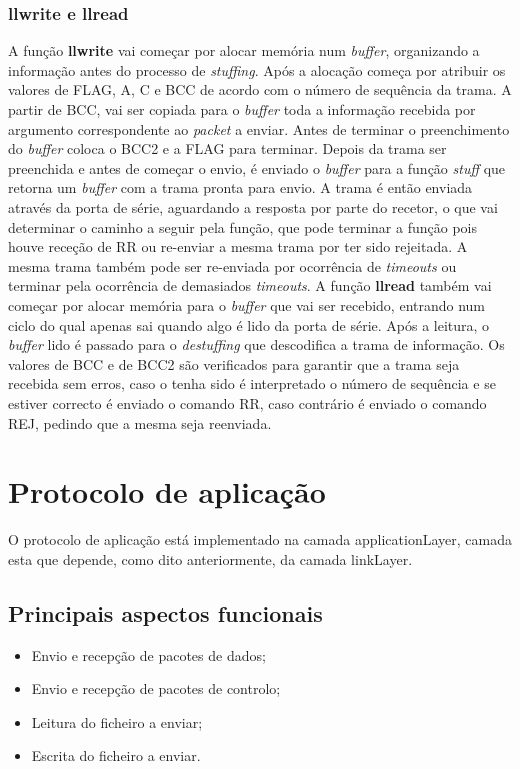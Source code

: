 \documentclass[11pt]{article}
\begin{document}
 \subsubsection{llwrite e llread}
    
    A função \textbf{llwrite} vai começar por alocar memória num \textit{buffer}, organizando a informação antes do processo de \textit{stuffing}. Após a alocação começa por atribuir os valores de FLAG, A, C e BCC de acordo com o número de sequência da trama. A partir de BCC, vai ser copiada para o \textit{buffer} toda a informação recebida por argumento correspondente ao \textit{packet} a enviar. Antes de terminar o preenchimento do \textit{buffer} coloca o BCC2 e a FLAG para terminar. Depois da trama ser preenchida e antes de começar o envio, é enviado o \textit{buffer} para a função \textit{stuff} que retorna um \textit{buffer} com a trama pronta para envio. A trama é então enviada através da porta de série, aguardando a resposta por parte do recetor, o que vai determinar o caminho a seguir pela função, que pode terminar a função pois houve receção de RR ou re-enviar a mesma trama por ter sido rejeitada. A mesma trama também pode ser re-enviada por ocorrência de \textit{timeouts} ou terminar pela ocorrência de demasiados \textit{timeouts}. A função \textbf{llread} também vai começar por alocar memória para o \textit{buffer} que vai ser recebido, entrando num ciclo do qual apenas sai quando algo é lido da porta de série. Após a leitura, o \textit{buffer} lido é passado para o \textit{destuffing} que descodifica a trama de informação. Os valores de BCC e de BCC2 são verificados para garantir que a trama seja recebida sem erros, caso o tenha sido é interpretado o número de sequência e se estiver correcto é enviado o comando RR, caso contrário é enviado o comando REJ, pedindo que a mesma seja reenviada.




\newpage
\section{Protocolo de aplicação}

O protocolo de aplicação está implementado na camada applicationLayer, camada esta que depende, como dito anteriormente, da camada linkLayer.

 \subsection{Principais aspectos funcionais}
 \begin{itemize}
  \item Envio e recepção de pacotes de dados;
  \item Envio e recepção de pacotes de controlo;
  \item Leitura do ficheiro a enviar;
  \item Escrita do ficheiro a enviar.
\end{itemize}
  
\end{document}
